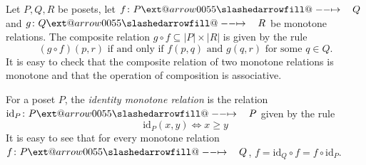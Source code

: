 \documentclass{beamer}
\makeatletter
\newcommand{\id}{\mathrm{id}}
\def\slashedarrowfill@#1#2#3#4#5{%
  $\m@th\thickmuskip0mu\medmuskip\thickmuskip\thinmuskip\thickmuskip
  \relax#5#1\mkern-7mu%
  \cleaders\hbox{$#5\mkern-2mu#2\mkern-2mu$}\hfill
  \mathclap{#3}\mathclap{#2}%
  \cleaders\hbox{$#5\mkern-2mu#2\mkern-2mu$}\hfill
  \mkern-7mu#4$%
}
\def\rightslashedarrowfill@{%
  \slashedarrowfill@\relbar\relbar\mapstochar\rightarrow}
\newcommand\xslashedrightarrow[2][]{%
  \ext@arrow 0055{\rightslashedarrowfill@}{#1}{#2}}
\newcommand{\sto}{\xslashedrightarrow{\hskip 1pc}}
\makeatother
\begin{document}
\begin{frame}
Let $P,Q,R$ be posets, let $f\colon P\sto Q$ and $g\colon Q\sto R$ be
monotone relations. The composite relation $g\circ f\subseteq|P|\times|R|$ is given
by the rule
$$
(g\circ f)(p,r)\text{ if and only if }
	f(p,q)\text{ and }g(q,r)\text{ for some }q\in Q.
$$
It is easy to check that the composite relation of two monotone relations is
monotone and that the operation of composition is associative.
\end{frame}

\begin{frame}
For a poset $P$, the {\em identity monotone relation} is the relation
$\id_P\colon P\sto P$ given by the rule
$$
\id_P(x,y)\Leftrightarrow x\geq y
$$
It is easy to see that for every monotone relation $f\colon P\sto Q$,
$f=\id_Q\circ f=f\circ\id_P$.
\end{frame}
\end{document}
